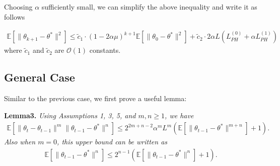 \documentclass[a4paper]{article}
\newcommand{\norm}[1]{\|#1 \|}
\newcommand{\Exs}{\mathbb{E}}
\newcommand{\thetastar}{\theta^*}
\newcommand{\constLPH}[1]{L_{PH}^{(#1)}}
\newcommand{\stepsize}{\alpha}
\begin{document}
	Choosing $\stepsize$ sufficiently small, we can simplify the above inequality and write it as follows
	
	\begin{align*}
		\Exs\left[\norm{\theta_{k + 1} - \thetastar}^{2}\right] \leq \tilde{c}_{1} \cdot \left(1 - 2\stepsize \mu\right)^{k + 1}\Exs\left[\norm{\theta_{0} - \thetastar}^{2}\right] + \tilde{c}_{2} \cdot 2\stepsize L\left(\constLPH{0} + \stepsize\constLPH{1}\right)
	\end{align*}
	where $\tilde{c}_{1}$ and $\tilde{c}_{2}$ are $\mathcal{O}\left(1\right)$ constants.
	
	
	
	
	
	\subsection{General Case}
	Similar to the previous case, we first prove a useful lemma:
	
	\textbf{Lemma3.} \textit{Using Assumptions 1, 3, 5, and $m, n \ge 1$, we have
		\begin{align*}
			\Exs\left[\norm{\theta_{t} - \theta_{t - 1}}^{m}\norm{\theta_{t - 1} - \thetastar}^{n}\right] \leq 2^{2m + n - 2}\stepsize^{m}L^{m}\left(\Exs\left[\norm{\theta_{t - 1} - \thetastar}^{m + n}\right] + 1\right).
		\end{align*}
		Also when $m = 0$, this upper bound can be written as
		\begin{align}
			\Exs\left[\norm{\theta_{t - 1} - \thetastar}^{n}\right] \leq 2^{n - 1}\left(\Exs\left[\norm{\theta_{t - 1} - \thetastar}^{n}\right] + 1\right).
		\end{align}
	}
	
\end{document}
